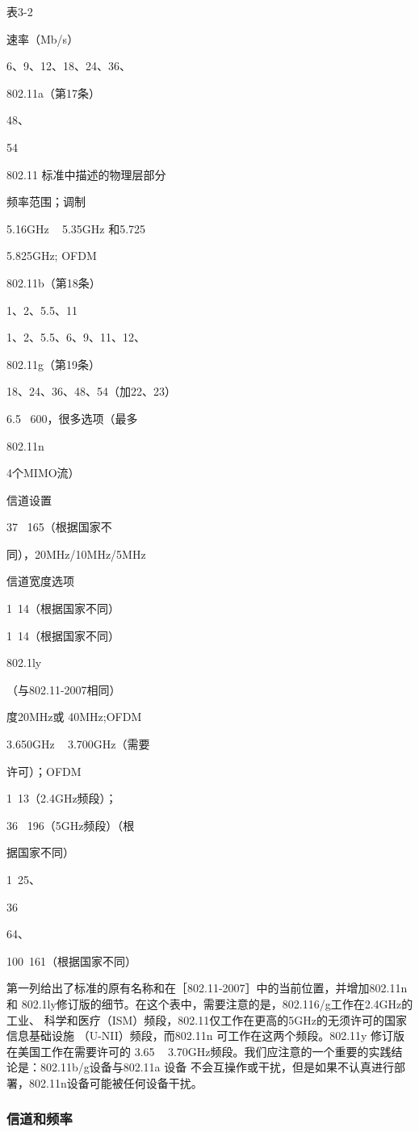表3-2

速率（Mb/s）

6、9、12、18、24、36、

802.11a（第17条）

48、

54

802.11 标准中描述的物理层部分

频率范围；调制

5.16GHz ~ 5.35GHz 和5.725~

5.825GHz; OFDM

802.11b（第18条）

1、2、5.5、11

1、2、5.5、6、9、11、12、

802.11g（第19条）

18、24、36、48、54（加22、23）

6.5 ~600，很多选项（最多

802.11n

4个MIMO流）

信道设置

37 ~165（根据国家不

同），20MHz/10MHz/5MHz

信道宽度选项

1~14（根据国家不同）

1~14（根据国家不同）

802.1ly

（与802.11-2007相同）

度20MHz或 40MHz;OFDM

3.650GHz ~ 3.700GHz（需要

许可）；OFDM

1~13（2.4GHz频段）；

36 ~196（5GHz频段）（根

据国家不同）

1~25、

36

64、

100~161（根据国家不同）

第一列给出了标准的原有名称和在［802.11-2007］中的当前位置，并增加802.11n和
802.1ly修订版的细节。在这个表中，需要注意的是，802.116/g工作在2.4GHz的工业、
科学和医疗（ISM）频段，802.11仅工作在更高的5GHz的无须许可的国家信息基础设施
（U-NII）频段，而802.11n 可工作在这两个频段。802.11y 修订版在美国工作在需要许可的
3.65 ~ 3.70GHz频段。我们应注意的一个重要的实践结论是：802.11b/g设备与802.11a 设备
不会互操作或干扰，但是如果不认真进行部署，802.11n设备可能被任何设备干扰。

\subsubsection{信道和频率}

